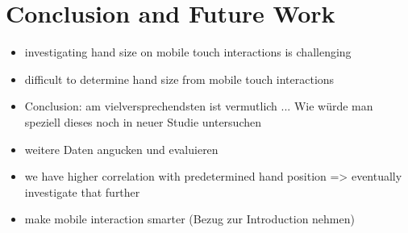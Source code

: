 \documentclass{sigchi}
\begin{document}
\section{Conclusion and Future Work}
\begin{itemize}
\item investigating hand size on mobile touch interactions is challenging
\item difficult to determine hand size from mobile touch interactions
\item Conclusion: am vielversprechendsten ist vermutlich ... Wie würde man speziell dieses noch in neuer Studie untersuchen
\item weitere Daten angucken und evaluieren
\item we have higher correlation with predetermined hand position => eventually investigate that further
\item make mobile interaction smarter (Bezug zur Introduction nehmen)
\end{itemize}



%
%
%
%
%
\balance{}

\balance{}



\end{document}
